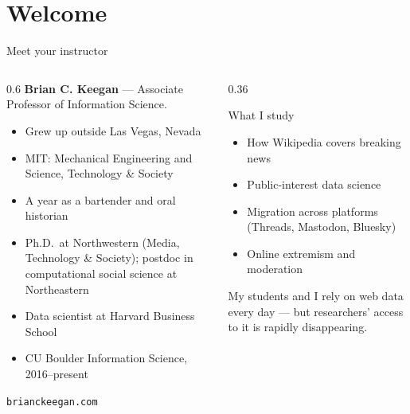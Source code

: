 \documentclass[9pt,aspectratio=169]{beamer}
\begin{document}
\section{Welcome}

\begin{frame}{Meet your instructor}
    \begin{columns}[T]
        \begin{column}{0.6\textwidth}
            \textbf{Brian C. Keegan} --- Associate Professor of Information Science.
            \begin{itemize}\small
                \item Grew up outside Las Vegas, Nevada
                \item MIT: Mechanical Engineering and Science, Technology \& Society
                \item A year as a bartender and oral historian
                \item Ph.D.\ at Northwestern (Media, Technology \& Society); postdoc in computational social science at Northeastern
                \item Data scientist at Harvard Business School
                \item CU Boulder Information Science, 2016--present
            \end{itemize}
            \vspace{0.5em}
            {\footnotesize \texttt{brianckeegan.com}}
        \end{column}
        \begin{column}{0.36\textwidth}
            \begin{block}{What I study}
                \footnotesize
                \begin{itemize}\footnotesize
                    \item How Wikipedia covers breaking news
                    \item Public-interest data science
                    \item Migration across platforms (Threads, Mastodon, Bluesky)
                    \item Online extremism and moderation
                \end{itemize}
            \end{block}
            {\footnotesize My students and I rely on web data every day --- but researchers' access to it is rapidly disappearing.}
        \end{column}
    \end{columns}
\end{frame}
\end{document}
